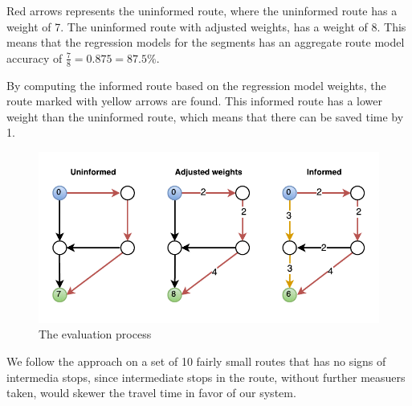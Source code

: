 Red arrows represents the uninformed route, where the uninformed route has a weight of 7. The uninformed route with adjusted weights, has a weight of 8. This means that the regression models for the segments has an aggregate route model accuracy of $\frac{7}{8}=0.875=87.5\%$. 

By computing the informed route based on the regression model weights, the route marked with yellow arrows are found. This informed route has a lower weight than the uninformed route, which means that there can be saved time by 1.

\begin{figure}
\centering
\includegraphics[width=\textwidth]{figures/eval.pdf}
\caption{The evaluation process}
\label{fig:eval}
\end{figure}

We follow the approach on a set of 10 fairly small routes that has no signs of intermedia stops, since intermediate stops in the route, without further measuers taken, would skewer the travel time in favor of our system.

